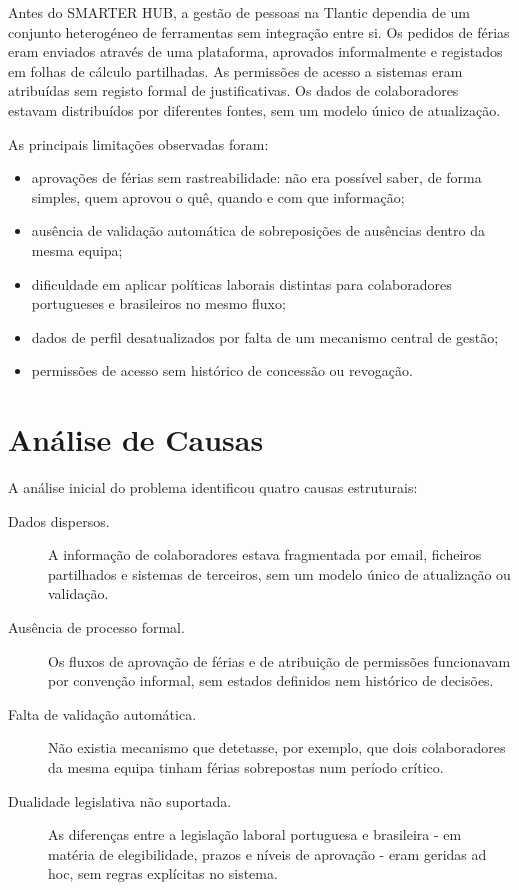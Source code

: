 \documentclass[12pt, a4paper, twoside, openright]{report}
\begin{document}
Antes do SMARTER HUB, a gestão de pessoas na Tlantic dependia de um conjunto
heterogéneo de ferramentas sem integração entre si. Os pedidos de férias eram enviados
através de uma plataforma, aprovados informalmente e registados em folhas de cálculo partilhadas. As
permissões de acesso a sistemas eram atribuídas sem registo formal de justificativas.
Os dados de colaboradores estavam distribuídos por diferentes fontes, sem um modelo
único de atualização.

As principais limitações observadas foram:

\begin{itemize}
  \item aprovações de férias sem rastreabilidade: não era possível saber, de forma
        simples, quem aprovou o quê, quando e com que informação;
  \item ausência de validação automática de sobreposições de ausências dentro da mesma
        equipa;
  \item dificuldade em aplicar políticas laborais distintas para colaboradores portugueses
        e brasileiros no mesmo fluxo;
  \item dados de perfil desatualizados por falta de um mecanismo central de gestão;
  \item permissões de acesso sem histórico de concessão ou revogação.
\end{itemize}

\section{Análise de Causas}

A análise inicial do problema identificou quatro causas estruturais:

\begin{description}
  \item[Dados dispersos.] A informação de colaboradores estava fragmentada por email,
        ficheiros partilhados e sistemas de terceiros, sem um modelo único de atualização
        ou validação.
  \item[Ausência de processo formal.] Os fluxos de aprovação de férias e de atribuição
        de permissões funcionavam por convenção informal, sem estados definidos nem
        histórico de decisões.
  \item[Falta de validação automática.] Não existia mecanismo que detetasse, por exemplo,
        que dois colaboradores da mesma equipa tinham férias sobrepostas num período crítico.
  \item[Dualidade legislativa não suportada.] As diferenças entre a legislação laboral
        portuguesa e brasileira - em matéria de elegibilidade, prazos e níveis de aprovação
        - eram geridas ad hoc, sem regras explícitas no sistema.
\end{description}
\end{document}
